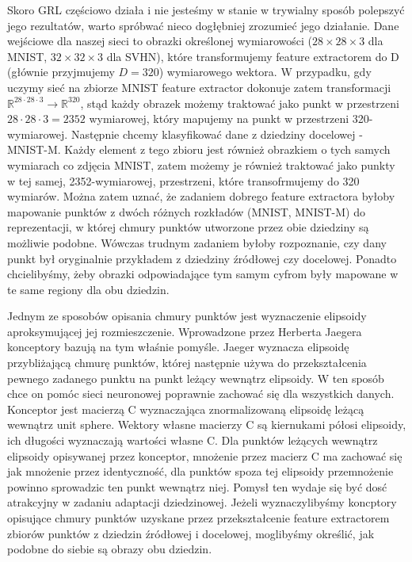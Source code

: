 \documentclass{article}
\begin{document}
Skoro GRL częściowo działa i nie jesteśmy w stanie w trywialny sposób polepszyć jego rezultatów, warto spróbwać nieco dogłębniej zrozumieć jego działanie. Dane wejściowe dla naszej sieci to obrazki określonej wymiarowości ($28 \times 28 \times 3$ dla MNIST, $32 \times 32 \times 3$ dla SVHN), które transformujemy feature extractorem do D (głównie przyjmujemy $D=320$) wymiarowego wektora. W przypadku, gdy uczymy sieć na zbiorze MNIST feature extractor dokonuje zatem transformacji $\mathbb{R}^{28 \cdot 28 \cdot 3} \rightarrow \mathbb{R}^{320}$, stąd każdy obrazek możemy traktować jako punkt w przestrzeni $28 \cdot 28 \cdot 3 = 2352$ wymiarowej, który mapujemy na punkt w przestrzeni 320-wymiarowej. Następnie chcemy klasyfikować dane z dziedziny docelowej - MNIST-M. Każdy element z tego zbioru jest również obrazkiem o tych samych wymiarach co zdjęcia MNIST, zatem możemy je również traktować jako punkty w tej samej, 2352-wymiarowej, przestrzeni, które transofrmujemy do 320 wymiarów. Można zatem uznać, że zadaniem dobrego feature extractora byłoby mapowanie punktów z dwóch różnych rozkładów (MNIST, MNIST-M) do reprezentacji, w której chmury punktów utworzone przez obie dziedziny są możliwie podobne. Wówczas trudnym zadaniem byłoby rozpoznanie, czy dany punkt był oryginalnie przykładem z dziedziny źródłowej czy docelowej. Ponadto chcielibyśmy, żeby obrazki odpowiadające tym samym cyfrom były mapowane w te same regiony dla obu dziedzin.
\par
Jednym ze sposobów opisania chmury punktów jest wyznaczenie elipsoidy aproksymującej jej rozmieszczenie. Wprowadzone przez Herberta Jaegera konceptory bazują na tym właśnie pomyśle. Jaeger wyznacza elipsoidę przybliżającą chmurę punktów, której następnie używa do przekształcenia pewnego zadanego punktu na punkt leżący wewnątrz elipsoidy. W ten sposób chce on pomóc sieci neuronowej poprawnie zachować się dla wszystkich danych. Konceptor jest macierzą C wyznaczająca znormalizowaną elipsoidę leżącą wewnątrz unit sphere. Wektory własne macierzy C są kiernukami półosi elipsoidy, ich długości wyznaczają wartości własne C. Dla punktów leżących wewnątrz elipsoidy opisywanej przez konceptor, mnożenie przez macierz C ma zachować się jak mnożenie przez identyczność, dla punktów spoza tej elipsoidy przemnożenie powinno sprowadzic ten punkt wewnątrz niej. Pomysł ten wydaje się być dosć atrakcyjny w zadaniu adaptacji dziedzinowej. Jeżeli wyznaczylibyśmy koncptory opisujące chmury punktów uzyskane przez przekształcenie feature extractorem zbiorów punktów z dziedzin źródłowej i docelowej, moglibyśmy określić, jak podobne do siebie są obrazy obu dziedzin. 
\end{document}
